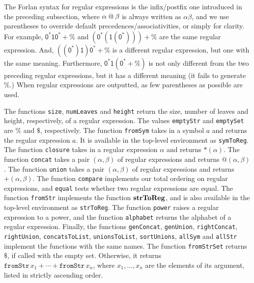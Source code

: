 The Forlan syntax for regular expressions is the infix/postfix one
%
%
introduced in the preceding subsection, where $\alpha\mathbin{@}\beta$
is always written as $\alpha\beta$, and we use parentheses
to override default precedences/associativities, or simply
for clarity.
For example, $\mathsf{0^*10^*+\%}$ and $\mathsf{(0^*(1(0^*)))+\%}$
are the same regular expression.  And, $\mathsf{((0^*)1)0^*+\%}$
is a different regular expression, but one with the same meaning.
Furthermore, $\mathsf{0^*1(0^*+\%)}$ is not only different from
the two preceding regular expressions, but it has a different
meaning (it fails to generate $\%$.)
When regular expressions are outputted, as few parentheses as
possible are used.

The functions \texttt{size}, \texttt{numLeaves}
and \texttt{height} return the size, number of leaves and
height, respectively, of a regular expression.
The values \texttt{emptyStr} and \texttt{emptySet} are
$\%$ and $\$$, respectively.  The function \texttt{fromSym}
takes in a symbol $a$ and returns the regular expression $a$.
It is available in the
top-level environment as \texttt{symToReg}.
%
The function \texttt{closure} takes in a regular expression $\alpha$ and
returns ${*}(\alpha)$.  The function \texttt{concat} takes a pair $(\alpha,
\beta)$ of regular expressions and returns ${@}(\alpha,\beta)$.
The function \texttt{union} takes a pair $(\alpha,
\beta)$ of regular expressions and returns ${+}(\alpha,\beta)$.
The function \texttt{compare} implements our total ordering on
regular expressions, and \texttt{equal} tests whether two
regular expressions are equal.
The function \texttt{fromStr} implements the function $\mathbf{strToReg}$,
and is also available in the top-level environment as \texttt{strToReg}.
%
The function \texttt{power} raises a regular
expression to a power, and the
function \texttt{alphabet} returns the alphabet of a regular
expression.
Finally, the functions \texttt{genConcat}, \texttt{genUnion},
\texttt{rightConcat}, \texttt{rightUnion}, \texttt{concatsToList},
\texttt{unionsToList}, \texttt{sortUnions}, \texttt{allSym} and
\texttt{allStr} implement the functions with the same names.
The function \texttt{fromStrSet} returns $\$$, if called with
the empty set. Otherwise, it returns $\mathtt{fromStr}\,x_1 + \cdots +
\mathtt{fromStr}\,x_n$, where $x_1,\ldots,x_n$ are the elements
of its argument, listed in strictly ascending order.

